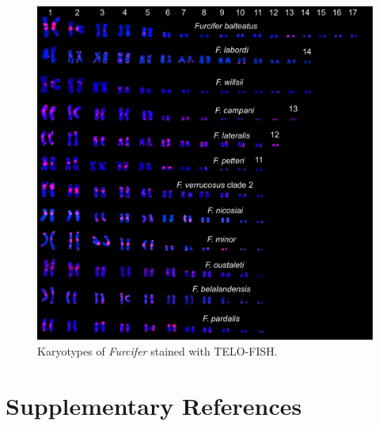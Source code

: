 \documentclass[a4paper, 12pt]{article}
\begin{document}
\newpage
\begin{figure}[H]
 \centering
  \includegraphics[width = \linewidth]{figures/marcello-s6.jpg}
  \caption{Karyotypes of \textit{Furcifer} stained with TELO-FISH.
}
  \label{fig-s6}
\end{figure}

\newpage
\section{Supplementary References}
 


\end{document}

